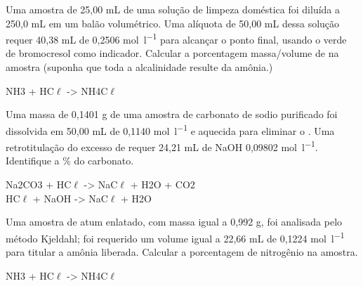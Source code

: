 \documentclass[12pt]{scrartcl}
\author{fabio}
\date{\today}
\title{}
\begin{document}
\pagebreak 

\smallbreak
\medbreak







\begin{exercise}
Uma amostra de 25,00 mL de uma solução de limpeza doméstica foi diluída a 250,0 mL em um balão volumétrico. Uma alíquota de 50,00 mL dessa solução requer 40,38 mL de  0,2506 \unit{\mol\per\litre} para alcançar o ponto final, usando o verde de bromocresol como indicador. Calcular a porcentagem massa/volume de  na amostra (suponha que toda a alcalinidade resulte da amônia.)

\begin{reaction*}
NH3 + HC$\ell$ -> NH4C$\ell$
\end{reaction*}
\end{exercise}


\begin{exercise}
Uma massa de 0,1401 g de uma amostra de carbonato de sodio purificado foi dissolvida em 50,00 mL de  0,1140 \unit{\mol\per\litre} e aquecida para eliminar o . Uma retrotitulação do excesso de  requer 24,21 mL de NaOH 0,09802 \unit{\mol\per\litre}. Identifique a \% do carbonato.

\begin{reactions}
Na2CO3 + HC$\ell$ -> NaC$\ell$ + H2O + CO2\\
HC$\ell$ + NaOH -> NaC$\ell$  + H2O
\end{reactions}
\end{exercise}


\begin{exercise}
Uma amostra de atum enlatado, com massa igual a 0,992 g, foi analisada pelo método Kjeldahl; foi requerido um volume igual a 22,66 mL de  0,1224 \unit{\mol\per\litre} para titular a amônia liberada. Calcular a porcentagem de nitrogênio na amostra.

\begin{reaction*}
NH3 + HC$\ell$ -> NH4C$\ell$
\end{reaction*}
\end{exercise}
\end{document}
